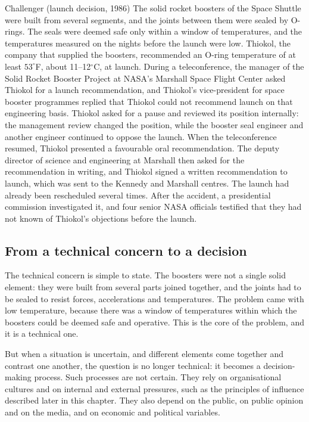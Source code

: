 \begin{casehistory}{Challenger (launch decision, 1986)}
	The solid rocket boosters of the Space Shuttle were built from several segments, and the joints between them were sealed by O-rings. The seals were deemed safe only within a window of temperatures, and the temperatures measured on the nights before the launch were low. Thiokol, the company that supplied the boosters, recommended an O-ring temperature of at least $53^{\circ}$F, about 11--12$^{\circ}$C, at launch. During a teleconference, the manager of the Solid Rocket Booster Project at NASA's Marshall Space Flight Center asked Thiokol for a launch recommendation, and Thiokol's vice-president for space booster programmes replied that Thiokol could not recommend launch on that engineering basis. Thiokol asked for a pause and reviewed its position internally: the management review changed the position, while the booster seal engineer and another engineer continued to oppose the launch. When the teleconference resumed, Thiokol presented a favourable oral recommendation. The deputy director of science and engineering at Marshall then asked for the recommendation in writing, and Thiokol signed a written recommendation to launch, which was sent to the Kennedy and Marshall centres. The launch had already been rescheduled several times. After the accident, a presidential commission investigated it, and four senior NASA officials testified that they had not known of Thiokol's objections before the launch.
\end{casehistory}

\subsection{From a technical concern to a decision}
The technical concern is simple to state. The boosters were not a single solid element: they were built from several parts joined together, and the joints had to be sealed to resist forces, accelerations and temperatures. The problem came with low temperature, because there was a window of temperatures within which the boosters could be deemed safe and operative. This is the core of the problem, and it is a technical one.

But when a situation is uncertain, and different elements come together and contrast one another, the question is no longer technical: it becomes a decision-making process. Such processes are not certain. They rely on organisational cultures and on internal and external pressures, such as the principles of influence described later in this chapter. They also depend on the public, on public opinion and on the media, and on economic and political variables.

